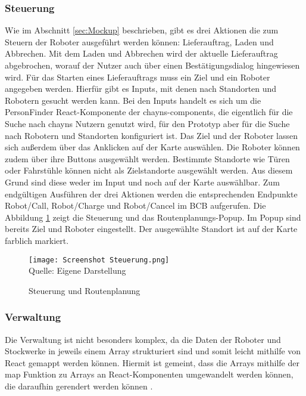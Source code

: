 \subsubsection{Steuerung}
Wie im Abschnitt \ref{sec:Mockup} beschrieben, gibt es drei Aktionen die zum Steuern der Roboter ausgeführt werden können: Lieferauftrag, Laden und Abbrechen. Mit dem Laden und Abbrechen wird der aktuelle Lieferauftrag abgebrochen, worauf der Nutzer auch über einen Bestätigungsdialog hingewiesen wird. Für das Starten eines Lieferauftrags muss ein Ziel und ein Roboter angegeben werden. Hierfür gibt es Inputs, mit denen nach Standorten und Robotern gesucht werden kann. Bei den Inputs handelt es sich um die PersonFinder React-Komponente \cite{ChaynsPersonFinder} der chayns-components, die eigentlich für die Suche nach chayns Nutzern genutzt wird, für den Prototyp aber für die Suche nach Robotern und Standorten konfiguriert ist. Das Ziel und der Roboter lassen sich außerdem über das Anklicken auf der Karte auswählen. Die Roboter können zudem über ihre Buttons ausgewählt werden. Bestimmte Standorte wie Türen oder Fahrstühle können nicht als Zielstandorte ausgewählt werden. Aus diesem Grund sind diese weder im Input und noch auf der Karte auswählbar. Zum endgültigen Ausführen der drei Aktionen werden die entsprechenden Endpunkte Robot/Call, Robot/Charge und Robot/Cancel im \ac{BCB} \cite{BCBSwagger} aufgerufen. Die Abbildung \ref{fig:ControlsScreenshot} zeigt die Steuerung und das Routenplanungs-Popup. Im Popup sind bereits Ziel und Roboter eingestellt. Der ausgewählte Standort ist auf der Karte farblich markiert.

\begin{figure}[H]
    \caption{Steuerung und Routenplanung}\label{fig:ControlsScreenshot}
    \texttt{[image: Screenshot Steuerung.png]}
    \\
    Quelle: Eigene Darstellung
\end{figure}

\subsubsection{Verwaltung}
Die Verwaltung ist nicht besonders komplex, da die Daten der Roboter und Stockwerke in jeweils einem Array strukturiert sind und somit leicht mithilfe von React gemappt werden können. Hiermit ist gemeint, dass die Arrays mithilfe der map Funktion zu Arrays an React-Komponenten umgewandelt werden können, die daraufhin gerendert werden können \cite[S.~35-36]{Boduch2020}.

